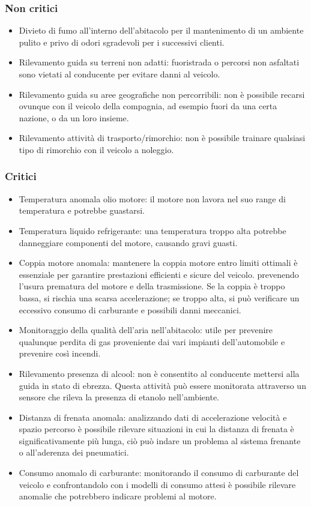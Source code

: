 \documentclass[12pt, a4paper, italian]{report}
\numberwithin{figure}{chapter}
\numberwithin{table}{chapter}
\begin{document}
\subsubsection{Non critici}

\begin{itemize}
    \item Divieto di fumo all'interno dell'abitacolo per il mantenimento di un ambiente pulito e privo di odori sgradevoli per i successivi clienti.
    \item Rilevamento guida su terreni non adatti: fuoristrada o percorsi non asfaltati sono vietati al conducente per evitare danni al veicolo. 
    \item Rilevamento guida su aree geografiche non percorribili: non è possibile recarsi ovunque con il veicolo della compagnia, ad esempio fuori da una certa nazione, o da un loro insieme.
    \item Rilevamento attività di trasporto/rimorchio: non è possibile trainare qualsiasi tipo di rimorchio con il veicolo a noleggio.
\end{itemize}

\subsubsection{Critici}

\begin{itemize}
    \item Temperatura anomala olio motore: il motore non lavora nel suo range di    temperatura e potrebbe guastarsi.
    \item Temperatura liquido refrigerante: una temperatura troppo alta potrebbe danneggiare componenti del motore, causando gravi guasti.
    \item Coppia motore anomala: mantenere la coppia motore entro limiti ottimali è essenziale per garantire prestazioni efficienti e sicure del veicolo. prevenendo l'usura prematura del motore e della trasmissione. Se la coppia è troppo bassa, si rischia una scarsa accelerazione; se troppo alta, si può verificare un eccessivo consumo di carburante e possibili danni meccanici.
    \item Monitoraggio della qualità dell'aria nell'abitacolo: utile per prevenire qualunque perdita di gas proveniente dai vari impianti dell'automobile e prevenire così incendi.
    \item Rilevamento presenza di alcool: non è consentito al conducente mettersi alla guida in stato di ebrezza. Questa attività può essere monitorata attraverso un sensore che rileva la presenza di etanolo nell'ambiente.
    \item Distanza di frenata anomala: analizzando dati di accelerazione velocità e spazio percorso è possibile rilevare situazioni in cui la distanza di frenata è significativamente più lunga, ciò può indare un problema al sistema frenante o all'aderenza dei pneumatici.
    \item Consumo anomalo di carburante: monitorando il consumo di carburante del veicolo e confrontandolo con i modelli di consumo attesi è possibile rilevare anomalie che potrebbero indicare problemi al motore.
\end{itemize}
\end{document}
